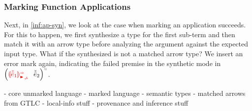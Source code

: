 \subsubsection{Marking Function Applications}
\label{sub:mark-ap-syn}
\begin{mathpar}
\label{inf:ap-syn}
\label{Marking and Synthesizing Function Applications}

\end{mathpar}

Next, in \autoref{inf:ap-syn}, we look at the case when marking an application succeeds. For this to happen, we first synthesize a type for the first sub-term and then match it with an arrow type before analyzing the argument against the expected input type. What if the synthesized is not a matched arrow type? We insert an error mark again, indicating the failed premise in the synthetic mode in $\app{\ECApSynNonMatchedArrow{\ELMV_1}}{\ELMV_2}$.

- core unmarked language
- marked language
- semantic types
- matched arrows from GTLC
- local-info stuff
- provenance and inference stuff


